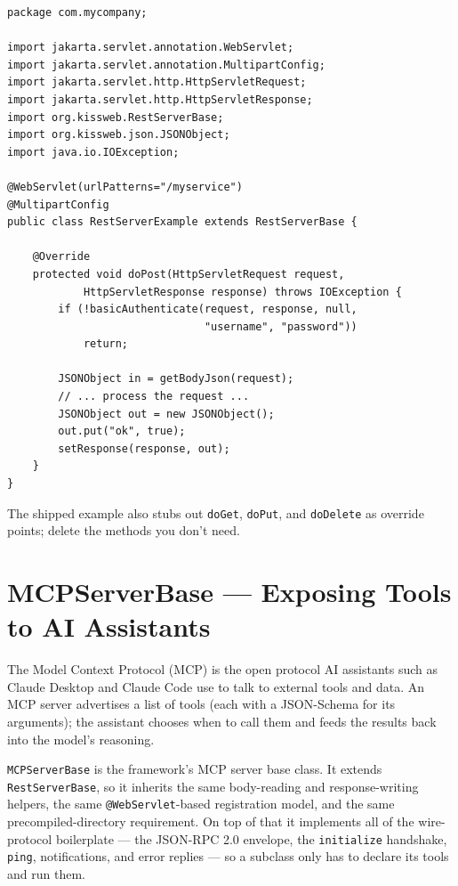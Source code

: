 \begin{lstlisting}[style=java]
package com.mycompany;

import jakarta.servlet.annotation.WebServlet;
import jakarta.servlet.annotation.MultipartConfig;
import jakarta.servlet.http.HttpServletRequest;
import jakarta.servlet.http.HttpServletResponse;
import org.kissweb.RestServerBase;
import org.kissweb.json.JSONObject;
import java.io.IOException;

@WebServlet(urlPatterns="/myservice")
@MultipartConfig
public class RestServerExample extends RestServerBase {

    @Override
    protected void doPost(HttpServletRequest request,
            HttpServletResponse response) throws IOException {
        if (!basicAuthenticate(request, response, null,
                               "username", "password"))
            return;

        JSONObject in = getBodyJson(request);
        // ... process the request ...
        JSONObject out = new JSONObject();
        out.put("ok", true);
        setResponse(response, out);
    }
}
\end{lstlisting}

\noindent
The shipped example also stubs out \texttt{doGet}, \texttt{doPut}, and \texttt{doDelete} as override points; delete the methods you don't need.

\section{MCPServerBase --- Exposing Tools to AI Assistants}
\label{sec:ext-mcpserverbase}

The Model Context Protocol (MCP) is the open protocol AI assistants such as Claude Desktop and Claude Code use to talk to external tools and data.  An MCP server advertises a list of tools (each with a JSON-Schema for its arguments); the assistant chooses when to call them and feeds the results back into the model's reasoning.

\texttt{MCPServerBase} is the framework's MCP server base class.  It extends \texttt{RestServer\-Base}, so it inherits the same body-reading and response-writing helpers, the same \texttt{@WebServlet}-based registration model, and the same precompiled-directory requirement.  On top of that it implements all of the wire-protocol boilerplate --- the JSON-RPC 2.0 envelope, the \texttt{initialize} handshake, \texttt{ping}, notifications, and error replies --- so a subclass only has to declare its tools and run them.


